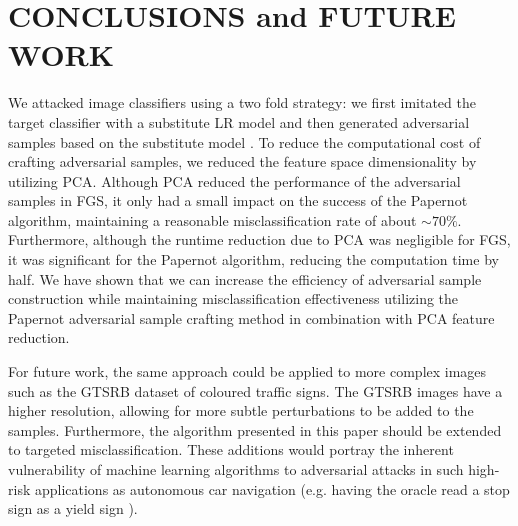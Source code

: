 \section{CONCLUSIONS and FUTURE WORK}

We attacked image classifiers using a two fold strategy: we first imitated the target classifier with a substitute LR model and then generated adversarial samples based on the substitute model \cite{papernot3}. To reduce the computational cost of crafting adversarial samples, we reduced the feature space dimensionality by utilizing PCA. Although PCA reduced the performance of the adversarial samples in FGS, it only had a small impact on the success of the Papernot algorithm, maintaining a reasonable misclassification rate of about $\sim 70\%$. Furthermore, although the runtime reduction due to PCA was negligible for FGS, it was significant for the Papernot algorithm, reducing the computation time by half. We have shown that we can increase the efficiency of adversarial sample construction while maintaining misclassification effectiveness utilizing the Papernot adversarial sample crafting method in combination with PCA feature reduction. 



For future work, the same approach could be applied to more complex images such as the GTSRB dataset of coloured traffic signs. The GTSRB images have a higher resolution, allowing for more subtle perturbations to be added to the samples. Furthermore, the algorithm presented in this paper should be extended to targeted misclassification. These additions would portray the inherent vulnerability of machine learning algorithms to adversarial attacks in such high-risk applications as autonomous car navigation (e.g. having the oracle read a stop sign as a yield sign \cite{papernot1}). 